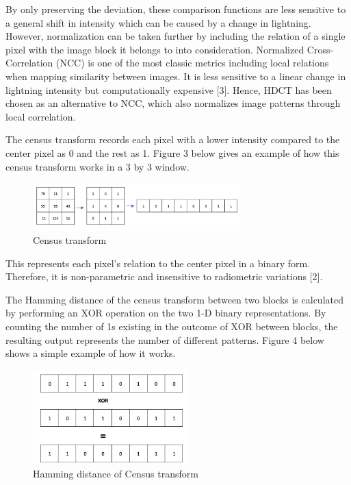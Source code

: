 \documentclass[conference]{IEEEtran}
\begin{document}
By only preserving the deviation, these comparison functions are less sensitive to a general shift in intensity which can be caused by a change in lightning. However, normalization can be taken further by including the relation of a single pixel with the image block it belongs to into consideration. Normalized Cross-Correlation (NCC) is one of the most classic metrics including local relations when mapping similarity between images. It is less sensitive to a linear change in lightning intensity but computationally expensive [3]. Hence, HDCT has been chosen as an alternative to NCC, which also normalizes image patterns through local correlation. 

The census transform records each pixel with a lower intensity compared to the center pixel as 0 and the rest as 1. Figure 3 below gives an example of how this census transform works in a 3 by 3 window.

\begin{figure}[H]
    \centering
    \includegraphics[width=8cm]{fig1.png}
    \caption{Census transform}
\end{figure}

This represents each pixel's relation to the center pixel in a binary form. Therefore, it is non-parametric and insensitive to radiometric variations [2].

The Hamming distance of the census transform between two blocks is calculated by performing an XOR operation on the two 1-D binary representations. By counting the number of 1s existing in the outcome of XOR between blocks, the resulting output represents the number of different patterns. Figure 4 below shows a simple example of how it works.

\begin{figure}[H]
    \centering
    \includegraphics[width=6cm]{fig2.png}
    \caption{Hamming distance of Census transform}
\end{figure}
\end{document}
